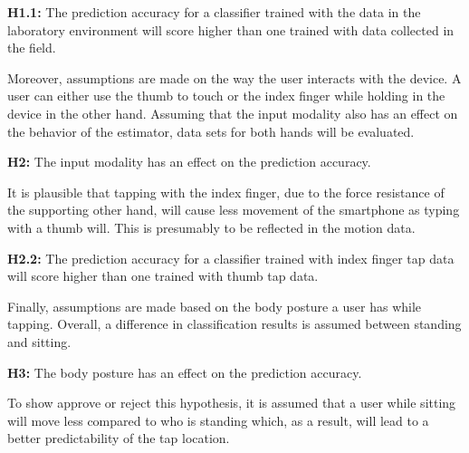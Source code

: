 \begin{center}
  \begin{framed}
    \textbf{H1.1:} The prediction accuracy for a classifier trained with the data in the laboratory environment will score higher than one trained with data collected in the field.
  \end{framed}
\end{center}

Moreover, assumptions are made on the way the user interacts with the device. A user can either use the thumb to touch or the index finger while holding in the device in the other hand. Assuming that the input modality also has an effect on the behavior of the estimator, data sets for both hands will be evaluated.

\begin{center}
  \begin{mdframed}[backgroundcolor=gray!10]
    \textbf{H2:} The input modality has an effect on the prediction accuracy.
  \end{mdframed}
\end{center}

It is plausible that tapping with the index finger, due to the force resistance of the supporting other hand, will cause less movement of the smartphone as typing with a thumb will. This is presumably to be reflected in the motion data.

\begin{center}
  \begin{framed}
    \textbf{H2.2:} The prediction accuracy for a classifier trained with index finger tap data will score higher than one trained with thumb tap data.
  \end{framed}
\end{center}

Finally, assumptions are made based on the body posture a user has while tapping. Overall, a difference in classification results is assumed between standing and sitting.
\begin{center}
  \begin{mdframed}[backgroundcolor=gray!10]
    \textbf{H3:} The body posture has an effect on the prediction accuracy.
  \end{mdframed}
\end{center}

To show approve or reject this hypothesis, it is assumed that a user while sitting will move less compared to who is standing which, as a result, will lead to a better predictability of the tap location.

